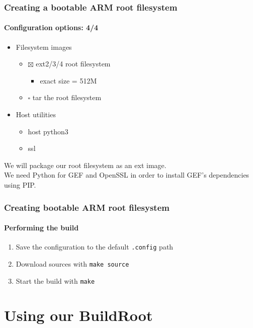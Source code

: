 {  \begin{frame}
    \frametitle{Creating a bootable ARM root filesystem}
    \framesubtitle{Configuration options: 4/4}
    \begin{itemize}
      \item Filesystem images
      \begin{itemize}
        \item $\boxtimes$ ext2/3/4 root filesystem
        \begin{itemize}
          \item exact size = 512M
        \end{itemize}
        \item $\square$ tar the root filesystem
      \end{itemize}
      \item Host utilities
      \begin{itemize}
        \item host python3
        \item ssl
      \end{itemize}
    \end{itemize}
  \end{frame}
   {
    We will package our root filesystem as an ext image. \\
    We need Python for GEF and OpenSSL in order to install GEF's dependencies using PIP.
  }

  \begin{frame}
    \frametitle{Creating bootable ARM root filesystem}
    \framesubtitle{Performing the build}
    \begin{enumerate}
      \item Save the configuration to the default \texttt{.config} path
      \item Download sources with \texttt{make source}
      \item Start the build with \texttt{make}
    \end{enumerate}
  \end{frame}
}
\section{Using our BuildRoot}
